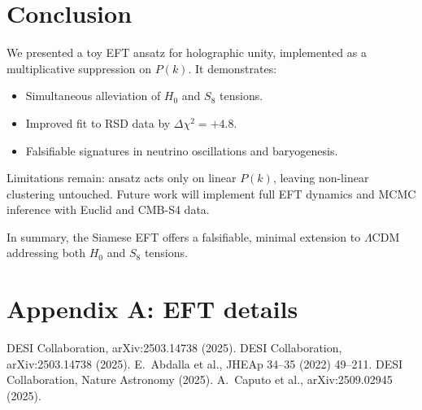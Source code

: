 \documentclass[11pt,a4paper]{article}
\begin{document}
\section{Conclusion}
We presented a toy EFT ansatz for holographic unity, implemented as a multiplicative suppression on $P(k)$. It demonstrates:

\begin{itemize}
    \item Simultaneous alleviation of $H_0$ and $S_8$ tensions.  
    \item Improved fit to RSD data by $\Delta\chi^2=+4.8$.  
    \item Falsifiable signatures in neutrino oscillations and baryogenesis.  
\end{itemize}

Limitations remain: ansatz acts only on linear $P(k)$, leaving non-linear clustering untouched. Future work will implement full EFT dynamics and MCMC inference with Euclid and CMB-S4 data.

In summary, the Siamese EFT offers a falsifiable, minimal extension to $\Lambda$CDM addressing both $H_0$ and $S_8$ tensions.

\appendix
\section*{Appendix A: EFT details}

\begin{thebibliography}{99}\setlength{\itemsep}{2pt}
 DESI Collaboration, arXiv:2503.14738 (2025).
 DESI Collaboration, arXiv:2503.14738 (2025).
 E.~Abdalla et al., JHEAp 34--35 (2022) 49--211.
 DESI Collaboration, Nature Astronomy (2025).
 A.~Caputo et al., arXiv:2509.02945 (2025).
\end{thebibliography}
\end{document}
